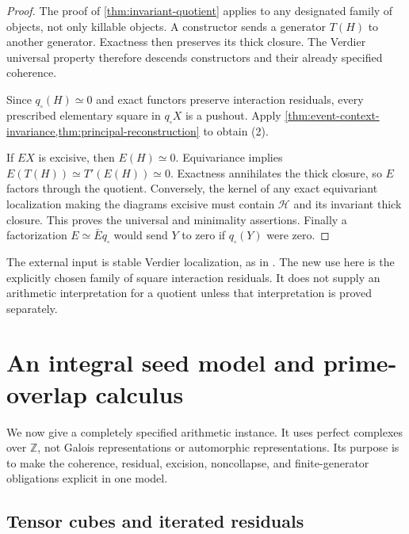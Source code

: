 \begin{proof}
The proof of \cref{thm:invariant-quotient} applies to any designated family of objects, not only killable objects. A constructor sends a generator $T(H)$ to another generator. Exactness then preserves its thick closure. The Verdier universal property therefore descends constructors and their already specified coherence.

Since $q_{\square}(H)\simeq0$ and exact functors preserve interaction residuals, every prescribed elementary square in $q_{\square}X$ is a pushout. Apply \cref{thm:event-context-invariance,thm:principal-reconstruction} to obtain (2).

If $EX$ is excisive, then $E(H)\simeq0$. Equivariance implies $E(T(H))\simeq T'(E(H))\simeq0$. Exactness annihilates the thick closure, so $E$ factors through the quotient. Conversely, the kernel of any exact equivariant localization making the diagrams excisive must contain $\mathscr H$ and its invariant thick closure. This proves the universal and minimality assertions. Finally a factorization $E\simeq\bar E q_{\square}$ would send $Y$ to zero if $q_{\square}(Y)$ were zero.
\end{proof}

The external input is stable Verdier localization, as in \cite{Drew2015,StacksVerdier}. The new use here is the explicitly chosen family of square interaction residuals. It does not supply an arithmetic interpretation for a quotient unless that interpretation is proved separately.

\section{An integral seed model and prime-overlap calculus}\label{sec:integral-model}

We now give a completely specified arithmetic instance. It uses perfect complexes over $\mathbb Z$, not Galois representations or automorphic representations. Its purpose is to make the coherence, residual, excision, noncollapse, and finite-generator obligations explicit in one model.

\subsection{Tensor cubes and iterated residuals}

